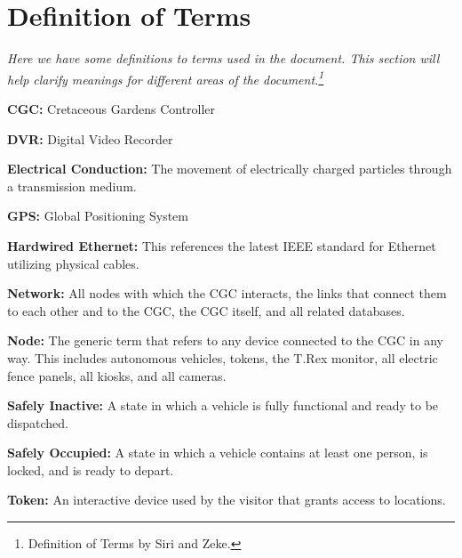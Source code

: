 \documentclass[12pt]{article}
\begin{document}
\section{Definition of Terms}
\label{def}
\textit{Here we have some definitions to terms used in the document. This section will help clarify meanings for different 
areas of the document.\footnote {Definition of Terms by Siri and Zeke.}}
\begin{list}{}{}
    \item \textbf{CGC:} Cretaceous Gardens Controller 
    \item \textbf{DVR:} Digital Video Recorder
    \item \textbf{Electrical Conduction:} The movement of electrically charged particles through a transmission medium.
    \item \textbf{GPS:} Global Positioning System 
    \item \textbf{Hardwired Ethernet:} This references the latest IEEE standard for Ethernet utilizing physical cables.
    \item \textbf{Network:} All nodes with which the CGC interacts, the links that connect them to each other and to the
    CGC, the CGC itself, and all related databases.
    \item \textbf{Node:} The generic term that refers to any device connected to the CGC in any way. This includes 
    autonomous vehicles, tokens, the T.Rex monitor, all electric fence panels, all kiosks, and all cameras.
    \item \textbf{Safely Inactive:} A state in which a vehicle is fully functional and ready to be dispatched.
    \item \textbf{Safely Occupied:} A state in which a vehicle contains at least one person, is locked, and is ready to depart.
    \item \textbf{Token:} An interactive device used by the visitor that grants access to locations.
\end{list}


\end{document}
